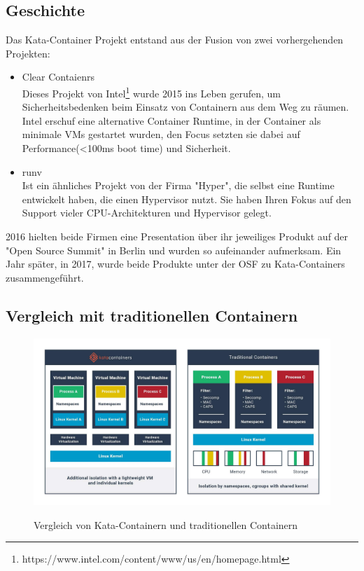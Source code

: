 \subsection{Geschichte}
Das Kata-Container Projekt entstand aus der Fusion von zwei vorhergehenden Projekten:
\begin{itemize}
        \item Clear Contaienrs
        \\Dieses Projekt von Intel\footnote{https://www.intel.com/content/www/us/en/homepage.html} wurde 2015 ins Leben gerufen, um Sicherheitsbedenken beim Einsatz von Containern aus dem Weg zu räumen.
        Intel erschuf eine alternative Container Runtime, in der Container als minimale \ac{VM}s gestartet wurden, den Focus setzten sie dabei auf Performance(<100ms boot time) und Sicherheit.\cite[S.1]{Kata_Containers}
        \item runv
        \\Ist ein ähnliches Projekt von der Firma "Hyper", die selbst eine Runtime entwickelt haben, die einen Hypervisor nutzt.
        Sie haben Ihren Fokus auf den Support vieler CPU-Architekturen und Hypervisor gelegt.\cite[S.1]{Kata_Containers}
\end{itemize}
2016 hielten beide Firmen eine Presentation über ihr jeweiliges Produkt auf der "Open Source Summit" in Berlin und wurden so aufeinander aufmerksam.
Ein Jahr später, in 2017, wurde beide Produkte unter der \ac{OSF} zu Kata-Containers zusammengeführt.\cite{kata_history}

\subsection{Vergleich mit traditionellen Containern}

\begin{figure}[h]
        \caption{Vergleich von Kata-Containern und traditionellen Containern\cite{kata_learn}}
        \centering
        \includegraphics[width=\textwidth]{bilder/katacontainers_traditionalvskata_diagram.jpg}
        \label{fig:kata_vs_traditional}
\end{figure}

